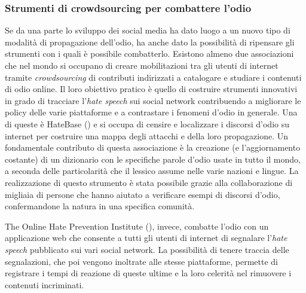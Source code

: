 \subsubsection{Strumenti di crowdsourcing per combattere l'odio}
Se da una parte lo sviluppo dei social media ha dato luogo a un nuovo tipo di modalità di propagazione dell'odio, ha anche dato la possibilità di ripensare gli strumenti con i quali è possibile combatterlo.
Esistono almeno due associazioni che nel mondo si occupano di creare mobilitazioni tra gli utenti di internet tramite \textit{crowdsourcing} di contributi indirizzati a catalogare e studiare i contenuti di odio online. Il loro obiettivo pratico è quello di costruire strumenti innovativi in grado di tracciare l'\textit{hate speech} sui social network contribuendo a migliorare le policy delle varie piattaforme e a contrastare i fenomeni d'odio in generale.
Una di queste è HateBase () e si occupa di censire e localizzare  i discorsi d'odio su internet per costruire una mappa degli attacchi e della loro propagazione. Un fondamentale contributo di questa associazione è la creazione (e l'aggiornamento costante) di un dizionario con le specifiche parole d'odio usate in tutto il mondo, a seconda delle particolarità che il lessico assume nelle varie nazioni e lingue. La realizzazione di questo strumento è stata possibile grazie alla collaborazione di migliaia di persone che hanno aiutato a verificare esempi di discorsi d'odio, confermandone la natura in una specifica comunità.

The Online Hate Prevention Institute (), invece, combatte l'odio con un applicazione web che consente a tutti gli utenti di internet di segnalare l’\textit{hate speech} pubblicato sui vari social network. La possibilità di tenere traccia delle segnalazioni, che poi vengono inoltrate alle stesse piattaforme, permette di registrare i tempi di reazione di queste ultime e la loro celerità nel rimuovere i contenuti incriminati.

